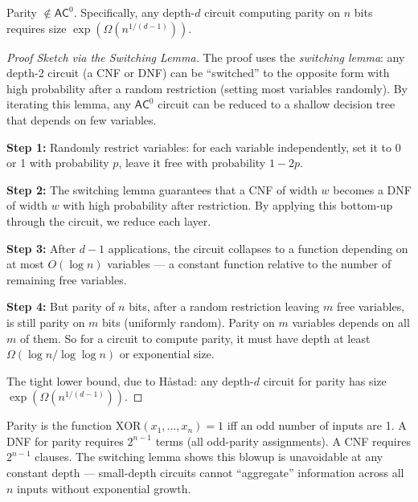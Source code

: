 \begin{theorem}
Parity $\notin \mathsf{AC}^0$. Specifically, any depth-$d$ circuit computing parity on $n$ bits requires size $\exp(\Omega(n^{1/(d-1)}))$.
\end{theorem}

\begin{proof}[Proof Sketch via the Switching Lemma]
The proof uses the \emph{switching lemma}: any depth-2 circuit (a CNF or DNF) can be ``switched'' to the opposite form with high probability after a random restriction (setting most variables randomly). By iterating this lemma, any $\mathsf{AC}^0$ circuit can be reduced to a shallow decision tree that depends on few variables.

\textbf{Step 1:} Randomly restrict variables: for each variable independently, set it to 0 or 1 with probability $p$, leave it free with probability $1-2p$. 

\textbf{Step 2:} The switching lemma guarantees that a CNF of width $w$ becomes a DNF of width $w$ with high probability after restriction. By applying this bottom-up through the circuit, we reduce each layer.

\textbf{Step 3:} After $d-1$ applications, the circuit collapses to a function depending on at most $O(\log n)$ variables — a constant function relative to the number of remaining free variables.

\textbf{Step 4:} But parity of $n$ bits, after a random restriction leaving $m$ free variables, is still parity on $m$ bits (uniformly random). Parity on $m$ variables depends on all $m$ of them. So for a circuit to compute parity, it must have depth at least $\Omega(\log n / \log \log n)$ or exponential size.

The tight lower bound, due to H{\aa}stad: any depth-$d$ circuit for parity has size $\exp(\Omega(n^{1/(d-1)}))$.
\end{proof}

\begin{example}
Parity is the function $\text{XOR}(x_1, \dots, x_n) = 1$ iff an odd number of inputs are 1. A DNF for parity requires $2^{n-1}$ terms (all odd-parity assignments). A CNF requires $2^{n-1}$ clauses. The switching lemma shows this blowup is unavoidable at any constant depth — small-depth circuits cannot ``aggregate'' information across all $n$ inputs without exponential growth.
\end{example}

